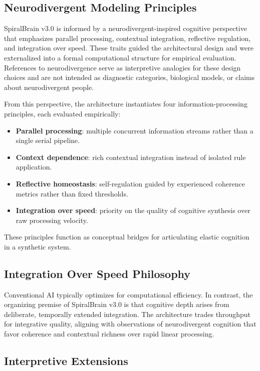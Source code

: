 \documentclass[11pt,a4paper]{article}
\begin{document}
\subsection{Neurodivergent Modeling Principles}

SpiralBrain v3.0 is informed by a neurodivergent-inspired cognitive perspective that emphasizes parallel processing, contextual integration, reflective regulation, and integration over speed. These traits guided the architectural design and were externalized into a formal computational structure for empirical evaluation. References to neurodivergence serve as interpretive analogies for these design choices and are not intended as diagnostic categories, biological models, or claims about neurodivergent people.

From this perspective, the architecture instantiates four information-processing principles, each evaluated empirically:
\begin{itemize}[leftmargin=2em]
    \item \textbf{Parallel processing}: multiple concurrent information streams rather than a single serial pipeline.
    \item \textbf{Context dependence}: rich contextual integration instead of isolated rule application.
    \item \textbf{Reflective homeostasis}: self-regulation guided by experienced coherence metrics rather than fixed thresholds.
    \item \textbf{Integration over speed}: priority on the quality of cognitive synthesis over raw processing velocity.
\end{itemize}
These principles function as conceptual bridges for articulating elastic cognition in a synthetic system.

\subsection{Integration Over Speed Philosophy}

Conventional AI typically optimizes for computational efficiency. In contrast, the organizing premise of SpiralBrain v3.0 is that cognitive depth arises from deliberate, temporally extended integration. The architecture trades throughput for integrative quality, aligning with observations of neurodivergent cognition that favor coherence and contextual richness over rapid linear processing.

\subsection{Interpretive Extensions}
\end{document}
